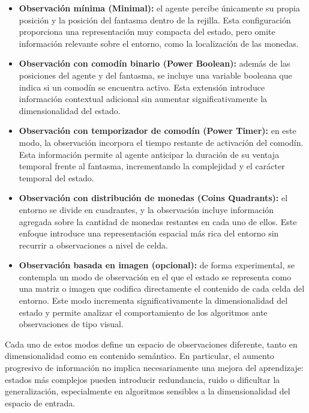 \begin{itemize}
    \item \textbf{Observación mínima (Minimal):} el agente percibe únicamente su propia posición y la posición del fantasma dentro de la rejilla. Esta configuración proporciona una representación muy compacta del estado, pero omite información relevante sobre el entorno, como la localización de las monedas.
    
    \item \textbf{Observación con comodín binario (Power Boolean):} además de las posiciones del agente y del fantasma, se incluye una variable booleana que indica si un comodín se encuentra activo. Esta extensión introduce información contextual adicional sin aumentar significativamente la dimensionalidad del estado.
    
    \item \textbf{Observación con temporizador de comodín (Power Timer):} en este modo, la observación incorpora el tiempo restante de activación del comodín. Esta información permite al agente anticipar la duración de su ventaja temporal frente al fantasma, incrementando la complejidad y el carácter temporal del estado.
    
    \item \textbf{Observación con distribución de monedas (Coins Quadrants):} el entorno se divide en cuadrantes, y la observación incluye información agregada sobre la cantidad de monedas restantes en cada uno de ellos. Este enfoque introduce una representación espacial más rica del entorno sin recurrir a observaciones a nivel de celda.
    
    \item \textbf{Observación basada en imagen (opcional):} de forma experimental, se contempla un modo de observación en el que el estado se representa como una matriz o imagen que codifica directamente el contenido de cada celda del entorno. Este modo incrementa significativamente la dimensionalidad del estado y permite analizar el comportamiento de los algoritmos ante observaciones de tipo visual.
\end{itemize}

Cada uno de estos modos define un espacio de observaciones diferente, tanto en dimensionalidad como en contenido semántico. En particular, el aumento progresivo de información no implica necesariamente una mejora del aprendizaje: estados más complejos pueden introducir redundancia, ruido o dificultar la generalización, especialmente en algoritmos sensibles a la dimensionalidad del espacio de entrada.

